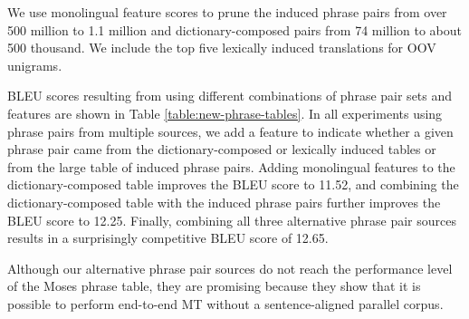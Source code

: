 \documentclass[11pt]{article}
\newcommand{\todopi}[2]{[\textcolor{red}{TODO for #1:} #2]}
\begin{document}
We use monolingual feature scores to prune the induced phrase pairs from over 500 million to 1.1 million and dictionary-composed pairs from 74 million to about 500 thousand. We include the top five lexically induced translations for OOV unigrams.

BLEU scores resulting from using different combinations of phrase pair sets and features are shown in Table \ref{table:new-phrase-tables}. In all experiments using phrase pairs from multiple sources, we add a feature to indicate whether a given phrase pair came from the dictionary-composed or lexically induced tables or from the large table of induced phrase pairs.
Adding monolingual features to the dictionary-composed table improves the BLEU score to 
11.52, and combining the dictionary-composed table with the induced phrase pairs further improves the BLEU score to 12.25. Finally, combining all three alternative phrase pair sources results in a surprisingly competitive BLEU score of 12.65. 

Although our alternative phrase pair sources do not reach the performance level of the Moses phrase table, they are promising because they show that it is possible to perform end-to-end MT without a sentence-aligned parallel corpus. %

\end{document}
